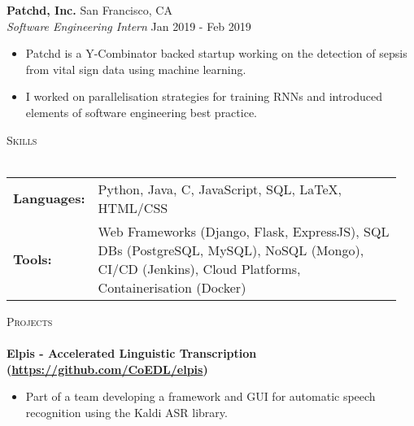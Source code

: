 \documentclass[a4paper]{article}
\newcommand{\lineunder} {
    \vspace*{-8pt} \\
    \hspace*{-10pt} \hrulefill \\
}
\newcommand{\header} [1] {
    {\hspace*{-10pt}\vspace*{6pt} \textsc{#1}}
    \vspace*{-6pt} \lineunder
}
\newenvironment{myitemize}
{   \small
    \vspace{-2pt}
    \begin{itemize}
    \setlength{\itemsep}{0pt}
    \setlength{\parskip}{0pt}
    \setlength{\parsep}{0pt}     }
{ \end{itemize}                  }
\newenvironment{singleitem}
{   \small
    \vspace{0pt}
    \begin{itemize}
    \setlength{\itemsep}{0pt}
    \setlength{\parskip}{0pt}
    \setlength{\parsep}{0pt}   }
{\end{itemize} \vspace{1pt}	}
\begin{document}
\textbf{Patchd, Inc.} \hfill San Francisco, CA\\
\textit{Software Engineering Intern} \hfill  Jan 2019 - Feb 2019\\
\begin{myitemize} \itemsep 0.5mm
	\item Patchd is a Y-Combinator backed startup working on the detection of sepsis from vital sign data using machine learning.
	\item I worked on parallelisation strategies for training RNNs and introduced elements of software engineering best practice.
\end{myitemize}

\vspace{0.5mm}
\header{Skills}
\vspace{1.5mm}
\begin{tabular}{p{0.12\linewidth}p{0.83\linewidth}}
	\textbf{Languages:} & Python, Java, C, JavaScript, SQL, \LaTeX, HTML/CSS \\
	\textbf{Tools:} & Web Frameworks (Django, Flask, ExpressJS), SQL DBs (PostgreSQL, MySQL), NoSQL (Mongo), CI/CD (Jenkins), Cloud Platforms, Containerisation (Docker)
\end{tabular}

\vspace{1.5mm}

\header{Projects}

\textbf{{Elpis - Accelerated Linguistic Transcription} (\href{https://github.com/CoEDL/elpis}{https://github.com/CoEDL/elpis})}
\begin{singleitem}
	\item Part of a team developing a framework and GUI for automatic speech recognition using the Kaldi ASR library.
\end{singleitem}
\end{document}
